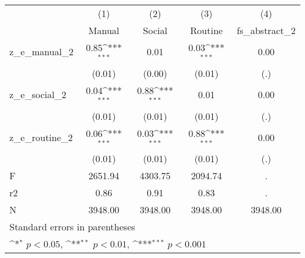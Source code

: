 {
\def\sym#1{\ifmmode^{#1}\else\(^{#1}\)\fi}
\begin{tabular}{l*{4}{c}}
\toprule
            &\multicolumn{1}{c}{(1)}&\multicolumn{1}{c}{(2)}&\multicolumn{1}{c}{(3)}&\multicolumn{1}{c}{(4)}\\
            &\multicolumn{1}{c}{Manual}&\multicolumn{1}{c}{Social}&\multicolumn{1}{c}{Routine}&\multicolumn{1}{c}{fs\_abstract\_2}\\
\midrule
z\_e\_manual\_2&        0.85\sym{***}&        0.01         &        0.03\sym{***}&        0.00         \\
            &      (0.01)         &      (0.00)         &      (0.01)         &         (.)         \\
\addlinespace
z\_e\_social\_2&        0.04\sym{***}&        0.88\sym{***}&        0.01         &        0.00         \\
            &      (0.01)         &      (0.01)         &      (0.01)         &         (.)         \\
\addlinespace
z\_e\_routine\_2&        0.06\sym{***}&        0.03\sym{***}&        0.88\sym{***}&        0.00         \\
            &      (0.01)         &      (0.01)         &      (0.01)         &         (.)         \\
\midrule
F           &     2651.94         &     4303.75         &     2094.74         &           .         \\
r2          &        0.86         &        0.91         &        0.83         &           .         \\
N           &     3948.00         &     3948.00         &     3948.00         &     3948.00         \\
\bottomrule
\multicolumn{5}{l}{\footnotesize Standard errors in parentheses}\\
\multicolumn{5}{l}{\footnotesize \sym{*} \(p<0.05\), \sym{**} \(p<0.01\), \sym{***} \(p<0.001\)}\\
\end{tabular}
}
